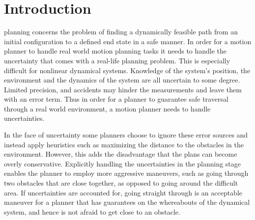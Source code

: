 
\section{Introduction}
 planning concerns the problem of finding a dynamically
feasible path from an initial configuration to a defined end state in a safe
manner. In order for a motion planner to handle real world motion planning tasks
it needs to handle the uncertainty that comes with a real-life planning problem.
This is especially difficult for nonlinear dynamical systems. Knowledge of
the system's position, the environment and the dynamics of the system are all uncertain to
some degree. Limited precision,
and accidents may hinder the measurements and leave them with an error term.
Thus in order for a planner to
guarantee safe traversal through a real world environment, a motion planner
needs to handle uncertainties.

In the face of uncertainty some planners choose to ignore these error sources
and instead apply heuristics such as maximizing the distance to the obstacles in
the environment. However, this adds the disadvantage that the plans can become
overly conservative. Explicitly handling the uncertainties in the planning stage
enables the planner to employ more aggressive maneuvers, such as going through
two obstacles that are close together, as opposed to going around the difficult
area. If uncertainties are accounted for, going straight through is an
acceptable maneuver for a planner that has guarantees on the whereabouts of the
dynamical system, and hence is not afraid to get close to an obstacle.




%


